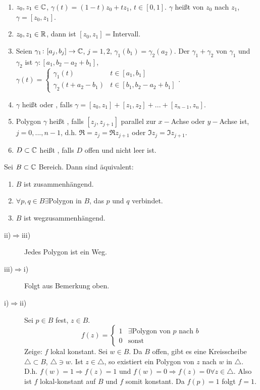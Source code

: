 \begin{definition}
	\bullshit
	\begin{enumerate}
		\item $ z_0,z_1\in\mathbb{C} $, $ \gamma(t)=(1-t)z_0+tz_1 $, $ t\in[0,1] $. $ \gamma $ hei\ss t  von $ z_0 $ nach $ z_1 $, $ \gamma=[z_0,z_1] $.
		\item $ z_0,z_1\in\mathbb{R} $, dann ist $ [z_0,z_1]= $Intervall.
		\item Seien $ \gamma_1\colon[a_j,b_j]\rightarrow\mathbb{C} $, $ j=1,2 $, $ \gamma_1(b_1)=\gamma_2(a_2) $. Der  $ \gamma_1+\gamma_2 $ von $ \gamma_1 $ und $ \gamma_2 $ ist $ \gamma\colon[a_1,b_2-a_2+b_1] $, $ \gamma(t)=\begin{cases}
		\gamma_1(t)&t\in[a_1,b_1]\\\gamma_2(t+a_2-b_1)&t\in[b_1,b_2-a_2+b_1]
		\end{cases} $.
		\item $ \gamma $ hei\ss t  oder , falls $ \gamma=[z_0,z_1]+[z_1,z_2]+...+[z_{n-1},z_n] $.
		\item Polygon $ \gamma $ hei\ss t , falls $ [z_j,z_{j+1}] $ parallel zur $ x- $Achse oder $ y- $Achse ist, $ j=0,...,n-1 $, d.h. $ \Re=z_j=\Re z_{j+1} $ oder $ \Im z_j=\Im z_{j+1} $.
		\item $ D\subset\mathbb{C} $ hei\ss t , falls $ D $ offen und nicht leer ist.
	\end{enumerate}
\end{definition}
\begin{satz}
	Sei $ B\subset\mathbb{C} $ Bereich. Dann sind \"aquivalent:
	\begin{enumerate}
		\item $ B $ ist zusammenh\"angend.
		\item $ \forall p,q\in B\exists $Polygon in $ B $, das $ p $ und $ q $ verbindet.
		\item $ B $ ist wegzusammenh\"angend.
	\end{enumerate}
\end{satz}
\newpage
\begin{beweis}
	\begin{description}
		\item[ii)$ \Rightarrow $iii)] Jedes Polygon ist ein Weg.
		\item[iii)$ \Rightarrow $i)] Folgt aus Bemerkung oben.
		\item[i)$ \Rightarrow $ii)] Sei $ p\in B $ fest, $ z\in B $.
		\[ f(z)=\begin{cases}
		1&  \exists \text{Polygon von }  p  \text{ nach }  b \\0& \text{sonst}
		\end{cases} \]
		Zeige: $ f $ lokal konstant. Sei $ w\in B $. Da $ B $ offen, gibt es eine Kreisscheibe $ \triangle\subset B $, $ \triangle\ni w $. Ist $ z\in\triangle $, so existiert ein Polygon von $ z $ nach $ w $ in $ \triangle $. D.h. $ f(w)=1\Rightarrow f(z)=1 $ und $ f(w)=0\Rightarrow f(z)=0 \forall z\in\triangle$. Also ist $ f $ lokal-konstant auf $ B $ und $ f $ somit konstant. Da $ f(p)=1 $ folgt $ f=1 $.
	\end{description}
\end{beweis}
